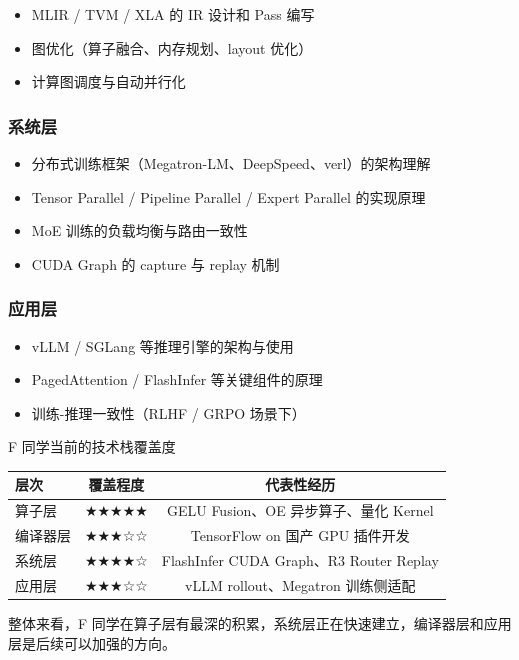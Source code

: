 \documentclass[a4paper]{article}
\begin{document}
\begin{itemize}
    \item MLIR / TVM / XLA 的 IR 设计和 Pass 编写
    \item 图优化（算子融合、内存规划、layout 优化）
    \item 计算图调度与自动并行化
\end{itemize}

\subsubsection{系统层}

\begin{itemize}
    \item 分布式训练框架（Megatron-LM、DeepSpeed、verl）的架构理解
    \item Tensor Parallel / Pipeline Parallel / Expert Parallel 的实现原理
    \item MoE 训练的负载均衡与路由一致性
    \item CUDA Graph 的 capture 与 replay 机制
\end{itemize}

\subsubsection{应用层}

\begin{itemize}
    \item vLLM / SGLang 等推理引擎的架构与使用
    \item PagedAttention / FlashInfer 等关键组件的原理
    \item 训练-推理一致性（RLHF / GRPO 场景下）
\end{itemize}

\begin{knowledgebox}{F 同学当前的技术栈覆盖度}
\begin{center}
\begin{tabular}{lcc}
\toprule
\textbf{层次} & \textbf{覆盖程度} & \textbf{代表性经历} \\
\midrule
算子层 & ★★★★★ & GELU Fusion、OE 异步算子、量化 Kernel \\
编译器层 & ★★★☆☆ & TensorFlow on 国产 GPU 插件开发 \\
系统层 & ★★★★☆ & FlashInfer CUDA Graph、R3 Router Replay \\
应用层 & ★★★☆☆ & vLLM rollout、Megatron 训练侧适配 \\
\bottomrule
\end{tabular}
\end{center}
整体来看，F 同学在算子层有最深的积累，系统层正在快速建立，编译器层和应用层是后续可以加强的方向。
\end{knowledgebox}
\end{document}
